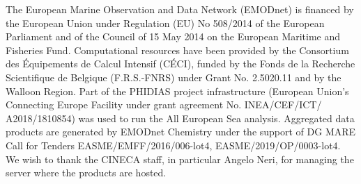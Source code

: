 \documentclass[essd, manuscript]{copernicus}
\begin{document}

\begin{acknowledgements}
The European Marine Observation and Data Network (EMODnet) is financed by the European Union under Regulation (EU) No 508/2014 of the European Parliament and of the Council of 15 May 2014 on the European Maritime and Fisheries Fund. Computational resources have been provided by the Consortium des Équipements de Calcul Intensif (CÉCI), funded by the Fonds de la Recherche Scientifique de Belgique (F.R.S.-FNRS) under Grant No. 2.5020.11 and by the Walloon Region. Part of the PHIDIAS project infrastructure (European Union's Connecting Europe Facility under grant agreement No. INEA/CEF/ICT/ A2018/1810854) was used to run the All European Sea analysis. Aggregated data products are generated by EMODnet Chemistry under the support of DG MARE Call for Tenders EASME/EMFF/2016/006-lot4, EASME/2019/OP/0003-lot4. We wish to thank the CINECA staff, in particular Angelo Neri​, for managing the server where the products are hosted.
\end{acknowledgements}







\end{document}
